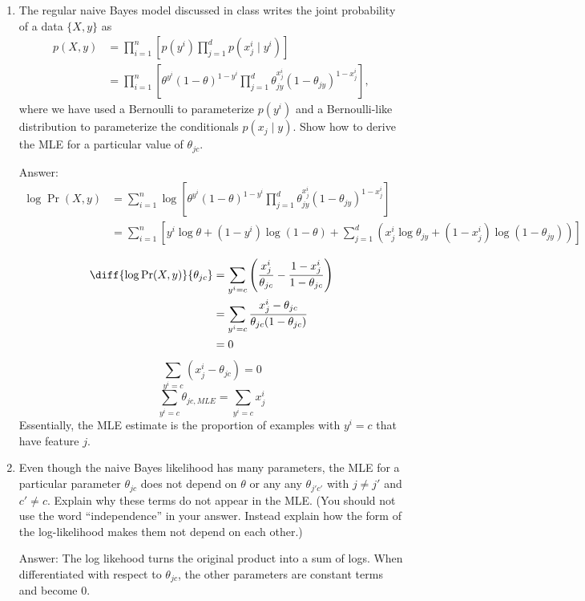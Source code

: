 \documentclass{article}
\def\ans#1{\par\gre{Answer: #1}}
\def\blu#1{{\color{blu}#1}}
\def\gre#1{{\color{gre}#1}}
\def\cond{\; | \;}
\def\enum#1{\begin{enumerate}#1\end{enumerate}}
\begin{document}
\enum{
\item The regular naive Bayes model discussed in class writes the joint probability of a data $\{X,y\}$ as
\begin{align*}
p(X, y) & = \prod_{i=1}^n \left[p(y^i)\prod_{j=1}^d p(x_j^i \cond y^i)\right]\\
& = \prod_{i=1}^n \left[ \theta^{y^i}(1-\theta)^{1-y^i}\prod_{j=1}^d \theta_{jy}^{x_j^i}(1-\theta_{jy})^{1-x_j^i}\right],
\end{align*}
where we have used a Bernoulli to parameterize $p(y^i)$ and a Bernoulli-like distribution to parameterize the conditionals $p(x_j \cond y)$. \blu{Show how to derive the MLE for a particular value of $\theta_{jc}$.}
\ans{
\begin{equation}
\begin{aligned}
    \log\Pr(X,y) 
    &= \sum_{i=1}^n \log \left[ \theta^{y^i}(1-\theta)^{1-y^i}
    \prod_{j=1}^d \theta_{jy}^{x_j^i}(1-\theta_{jy})^{1-x_j^i}\right]\\
    &= \sum_{i=1}^n \left[
        y^i \log\theta + (1-y^i)\log(1-\theta)
        + \sum_{j=1}^d \left(
            x_j^i \log\theta_{jy}
            + (1-x_j^i)\log(1-\theta_{jy})
        \right)
    \right]\\
\end{aligned}
\end{equation}
\begin{equation}
\begin{aligned}
    \diff{\log\Pr(X,y)}{\theta_{jc}}
    &= \sum_{y^i=c}
    \left(\frac{x_j^i}{\theta_{jc}}
    - \frac{1-x_j^i}{1-\theta_{jc}}\right)\\
    &= \sum_{y^i=c} \frac{x_j^i - \theta_{jc}}
    {\theta_{jc}(1-\theta_{jc})}\\
    &= 0
\end{aligned}
\end{equation}
\[\sum_{y^i=c} (x_j^i-\theta_{jc})=0\]
\[\sum_{y^i=c}\theta_{jc,MLE} = \sum_{y^i=c} x_j^i\]
Essentially, the MLE estimate is the proportion of examples with $y^i=c$ that have feature $j$.
}
\pagebreak
\item Even though the naive Bayes likelihood has many parameters, the MLE for a particular parameter $\theta_{jc}$ does not depend on $\theta$ or any any $\theta_{j'c'}$ with $j\neq j'$ and $c' \neq c$. \blu{Explain why these terms do not appear in the MLE.} (You should not use the word ``independence'' in your answer. Instead explain how the form of the log-likelihood makes them not depend on each other.)
\ans{The log likehood turns the original product into a sum of logs. When differentiated with respect to $\theta_{jc}$, the other parameters are constant terms and become 0.}
}
\end{document}
